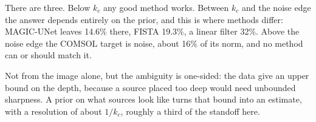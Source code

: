 \begin{defend}
There are three. Below $k_c$ any good method works. Between $k_c$ and the noise edge the answer depends entirely on the
prior, and this is where methods differ: MAGIC-UNet leaves 14.6\% there, FISTA 19.3\%, a linear filter 32\%. Above the
noise edge the COMSOL target is noise, about 16\% of its norm, and no method can or should match it.
\end{defend}

\begin{defend}
Not from the image alone, but the ambiguity is one-sided: the data give an upper bound on the depth, because a source
placed too deep would need unbounded sharpness. A prior on what sources look like turns that bound into an estimate,
with a resolution of about $1/k_c$, roughly a third of the standoff here.
\end{defend}
